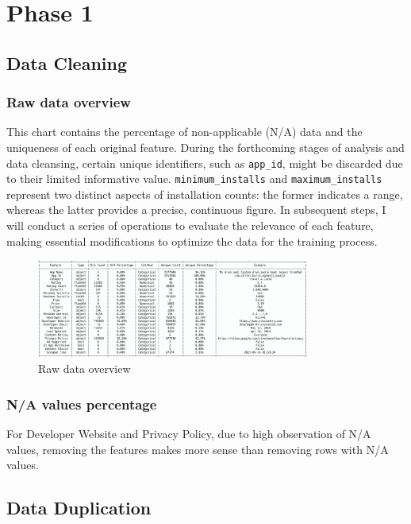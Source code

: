 \section{Phase 1}
\subsection{Data Cleaning}

\subsubsection{Raw data overview}
This chart contains the percentage of non-applicable (N/A) data and the uniqueness of each original feature. During the forthcoming stages of analysis and data cleansing, certain unique identifiers, such as \texttt{app\_id}, might be discarded due to their limited informative value. \texttt{minimum\_installs} and \texttt{maximum\_installs} represent two distinct aspects of installation counts: the former indicates a range, whereas the latter provides a precise, continuous figure. In subsequent steps, I will conduct a series of operations to evaluate the relevance of each feature, making essential modifications to optimize the data for the training process.

\begin{figure}[h]
\centering
\includegraphics[width=0.8\textwidth]{docs//assets/raw-data-overview.png}
\caption{Raw data overview}
\end{figure}

\subsubsection{N/A values percentage}
For Developer Website and Privacy Policy, due to high observation of N/A values, removing the features makes more sense than removing rows with N/A values.

\subsection{Data Duplication}


